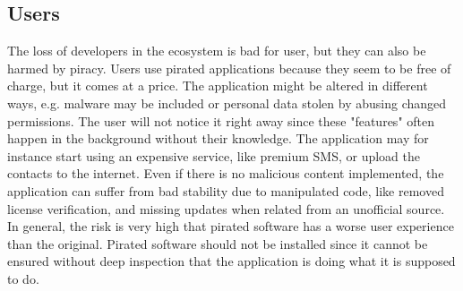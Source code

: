 \subsection{Users} \label{subsection:foundation-piracy-users}
The loss of developers in the ecosystem is bad for user, but they can also be harmed by piracy.
Users use pirated applications because they seem to be free of charge, but it comes at a price.
The application might be altered in different ways, e.g. malware may be included or personal data stolen by abusing changed permissions.
The user will not notice it right away since these "features" often happen in the background without their knowledge.
The application may for instance start using an expensive service, like premium SMS, or upload the contacts to the internet.
Even if there is no malicious content implemented, the application can suffer from bad stability due to manipulated code, like removed license verification, and missing updates when related from an unofficial source.
In general, the risk is very high that pirated software has a worse user experience than the original.
Pirated software should not be installed since it cannot be ensured without deep inspection that the application is doing what it is supposed to do. \cite{bitdefenderPlagiarism}\cite{lierschDeveloperThreats}
